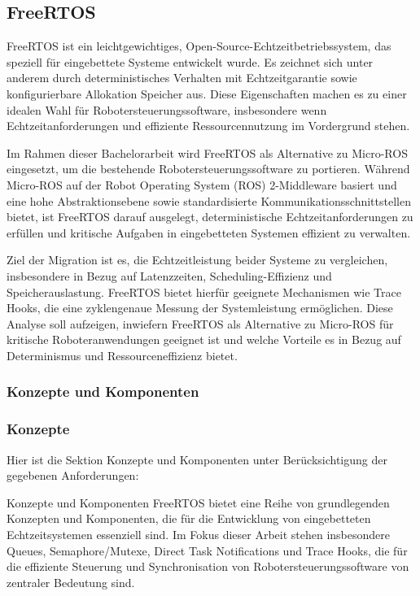\subsection{FreeRTOS}


FreeRTOS ist ein leichtgewichtiges, Open-Source-Echtzeitbetriebssystem, das
speziell für eingebettete Systeme entwickelt wurde. Es zeichnet sich unter
anderem durch deterministisches Verhalten mit Echtzeitgarantie sowie
konfigurierbare Allokation Speicher aus. Diese Eigenschaften machen es zu einer
idealen Wahl für Robotersteuerungssoftware, insbesondere wenn
Echtzeitanforderungen und effiziente Ressourcennutzung im Vordergrund stehen.

Im Rahmen dieser Bachelorarbeit wird FreeRTOS als Alternative zu Micro-ROS
eingesetzt, um die bestehende Robotersteuerungssoftware zu portieren. Während
Micro-ROS auf der Robot Operating System (ROS) 2-Middleware basiert und eine
hohe Abstraktionsebene sowie standardisierte Kommunikationsschnittstellen
bietet, ist FreeRTOS darauf ausgelegt, deterministische Echtzeitanforderungen zu
erfüllen und kritische Aufgaben in eingebetteten Systemen effizient zu
verwalten.

Ziel der Migration ist es, die Echtzeitleistung beider Systeme zu vergleichen,
insbesondere in Bezug auf Latenzzeiten, Scheduling-Effizienz und
Speicherauslastung. FreeRTOS bietet hierfür geeignete Mechanismen wie Trace
Hooks, die eine zyklengenaue Messung der Systemleistung ermöglichen. Diese
Analyse soll aufzeigen, inwiefern FreeRTOS als Alternative zu Micro-ROS für
kritische Roboteranwendungen geeignet ist und welche Vorteile es in Bezug auf
Determinismus und Ressourceneffizienz bietet. \subsubsection{Konzepte und
Komponenten}

\subsubsection{Konzepte}

Hier ist die Sektion Konzepte und Komponenten unter Berücksichtigung der
gegebenen Anforderungen:

Konzepte und Komponenten FreeRTOS bietet eine Reihe von grundlegenden Konzepten
und Komponenten, die für die Entwicklung von eingebetteten Echtzeitsystemen
essenziell sind. Im Fokus dieser Arbeit stehen insbesondere Queues,
Semaphore/Mutexe, Direct Task Notifications und Trace Hooks, die für die
effiziente Steuerung und Synchronisation von Robotersteuerungssoftware von
zentraler Bedeutung sind.


